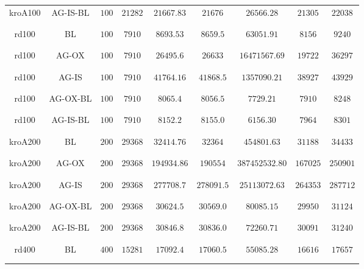 \begin{table}[H]
{\begin{tabular}{c|cccccccc}
		kroA100 &AG-IS-BL& $100$ & $21282$ & $21667.83$ & $ 21676$ & $26566.28$ & $21305$ & $22038$\\\\\\
		\midrule 
		rd100 &BL & $100$ & $7910$ & $8693.53$ & $8659.5$ & $63051.91$ & $8156$ & $9240$\\\\\\
		rd100 &AG-OX & $100$ & $7910$ & $26495.6$ & $26633$ & $16471567.69$ & $19722$ & $36297$\\\\\\
		rd100 &AG-IS & $100$ & $7910$ & $41764.16$ & $41868.5$ & $1357090.21$ & $38927$ & $43929$\\\\\\
		rd100 &AG-OX-BL& $100$ & $7910$ & $8065.4$ & $8056.5$ & $7729.21$ & $7910$ & $8248$\\\\\\
		rd100 &AG-IS-BL& $100$ & $7910$ & $8152.2$ & $8155.0$ & $6156.30$ & $7964$ & $8301$\\\\\\
		\midrule 
		kroA200 &BL & $200$ & $29368$ & $32414.76$ & $32364$ & $454801.63$ & $31188$ & $34433$\\\\\\
		kroA200 &AG-OX & $200$ & $29368$ & $194934.86$ & $190554$ & $387452532.80$ & $167025$ & $250901$\\\\\\
		kroA200 &AG-IS & $200$ & $29368$ & $277708.7$ & $278091.5$ & $25113072.63$ & $264353$ & $287712$\\\\\\
		kroA200 &AG-OX-BL& $200$ & $29368$ & $30624.5$ & $30569.0$ & $80085.15$ & $29950$ & $31124$\\\\\\
		kroA200 &AG-IS-BL& $200$ & $29368$ & $30846.8$ & $30836.0$ & $72260.71$ & $30091$ & $31240$\\\\\\
		\midrule 
		rd400 &BL & $400$ & $15281$ & $17092.4$ & $17060.5$ & $55085.28$ & $16616$ & $17657$\\\\\\

\end{tabular}}
\end{table}
